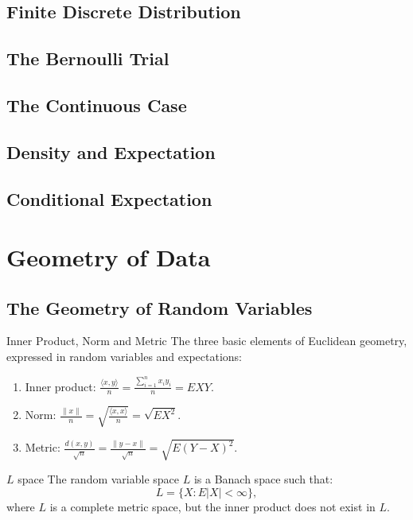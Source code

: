 \documentclass[11pt]{article}
\newenvironment{definition}[1]{\begin{defbox}{#1}{}}{\end{defbox}}
\theoremstyle{quiet}
\theoremstyle{quietremark}
\newcommand{\1}{\mathbf{1}}            %
\begin{document}
\subsection{Finite Discrete Distribution}

\subsection{The Bernoulli Trial}

\subsection{The Continuous Case}

\subsection{Density and Expectation}

\subsection{Conditional Expectation}

\newpage
\section{Geometry of Data}

\subsection{The Geometry of Random Variables}
\begin{definition}{Inner Product, Norm and Metric}
The three basic elements of Euclidean geometry, expressed in random variables and expectations:
\begin{enumerate}
\item Inner product: $\displaystyle\frac{\langle x,y\rangle}{n}=\frac{\sum_{i=1}^n x_iy_i}{n}=EXY$.
\item Norm: $\displaystyle\frac{\|x\|}{n}=\sqrt{\frac{\langle x,x\rangle}{n}}=\sqrt{EX^2}.$
\item Metric: $\displaystyle\frac{d(x,y)}{\sqrt{n}}=\frac{\|y-x\|}{\sqrt{n}}=\sqrt{E(Y-X)^2}$.
\end{enumerate}
\end{definition}

\begin{definition}{$L$ space}
The random variable space $L$ is a Banach space such that:
\[
L=\{X:E|X|<\infty\},
\]
where $L$ is a complete metric space, but the inner product does not exist in $L$.
\end{definition}
\end{document}
